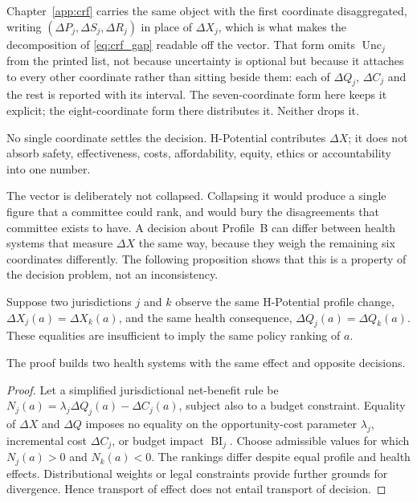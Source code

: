 \begin{remark}
Chapter~\ref{app:crf} carries the same object with the first coordinate
disaggregated, writing $(\Delta P_j,\Delta S_j,\Delta R_j)$ in place of
$\Delta X_j$, which is what makes the decomposition of
\eqref{eq:crf_gap} readable off the vector. That form
omits $\operatorname{Unc}_j$ from the printed list, not because uncertainty is
optional but because it attaches to every other coordinate rather than sitting
beside them: each of $\Delta Q_j$, $\Delta C_j$ and the rest is reported with
its interval. The seven-coordinate form here keeps it explicit; the
eight-coordinate form there distributes it. Neither drops it.
\end{remark}

\begin{remark}
No single coordinate settles the decision. H-Potential contributes
$\Delta X$; it does not absorb safety, effectiveness, costs, affordability,
equity, ethics or accountability into one number.
\end{remark}

The vector is deliberately not collapsed. Collapsing it would produce a single
figure that a committee could rank, and would bury the disagreements that
committee exists to have. A decision about Profile~B can differ between health
systems that measure $\Delta X$ the same way, because they weigh the remaining
six coordinates differently. The following proposition shows that this is a
property of the decision problem, not an inconsistency.

\begin{proposition}
Suppose two jurisdictions $j$ and $k$ observe the same H-Potential profile
change, $\Delta X_j(a)=\Delta X_k(a)$, and the same health consequence,
$\Delta Q_j(a)=\Delta Q_k(a)$. These equalities are insufficient to imply the
same policy ranking of $a$.
\end{proposition}

The proof builds two health systems with the same effect and opposite
decisions.
\begin{proof}
Let a simplified jurisdictional net-benefit rule be
$N_j(a)=\lambda_j\Delta Q_j(a)-\Delta C_j(a)$, subject also to a budget
constraint. Equality of $\Delta X$ and $\Delta Q$ imposes no equality on the
opportunity-cost parameter $\lambda_j$, incremental cost $\Delta C_j$, or
budget impact $\operatorname{BI}_j$. Choose admissible values for which
$N_j(a)>0$ and $N_k(a)<0$. The rankings differ despite equal profile and health
effects. Distributional weights or legal constraints provide further grounds
for divergence. Hence transport of effect does not entail transport of
decision.
\end{proof}

